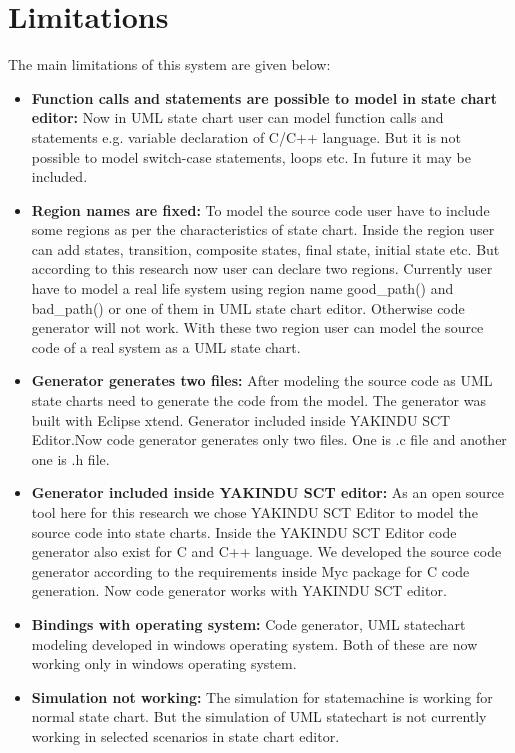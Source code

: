 \chapter{Limitations}
The main limitations of this system are given below:
\begin{itemize}
	\item \textbf{Function calls and statements are possible to model in state chart editor:} Now in UML state chart user can model function calls and statements e.g. variable declaration of C/C++ language. But it is not possible to model switch-case statements, loops etc. In future it may be included.
	
	\item \textbf{Region names are fixed:} To model the source code user have to include some regions as per the characteristics of state chart. Inside the region user can add states, transition, composite states, final state, initial state etc. But according to this research now user can declare two regions. Currently user have to model a real life system using region name good\_path() and bad\_path() or one of them in UML state chart editor. Otherwise code generator will not work. With these two region user can model the source code of a real system as a UML state chart. 
	
	\item \textbf{Generator generates two files:} After modeling the source code as UML state charts need to generate the code from the model. The generator was built with Eclipse xtend. Generator included inside YAKINDU SCT Editor.Now code generator generates only two files. One is .c file and another one is .h file.
	
	\item \textbf{Generator included inside YAKINDU SCT editor:} As an open source tool here for this research we chose YAKINDU SCT Editor to model the source code into state charts. Inside the YAKINDU SCT Editor code generator also exist for C and C++ language. We developed the source code generator according to the requirements inside Myc package for C code generation. Now code generator works with YAKINDU SCT editor.
	
	
	\item \textbf{Bindings with operating system:}  Code generator, UML statechart modeling developed in windows operating system. Both of these are now working only in windows operating system.
	
	\item \textbf{Simulation not working:} The simulation for statemachine is working for normal state chart. But the simulation of UML statechart is not currently working in selected scenarios in state chart editor.
	

\end{itemize}
